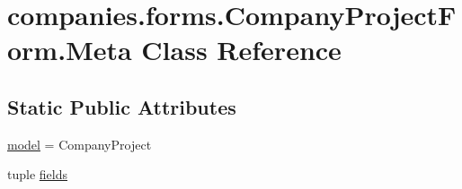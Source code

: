 \hypertarget{classcompanies_1_1forms_1_1_company_project_form_1_1_meta}{\section{companies.\-forms.\-Company\-Project\-Form.\-Meta Class Reference}
\label{classcompanies_1_1forms_1_1_company_project_form_1_1_meta}
}
\subsection*{Static Public Attributes}
\begin{DoxyCompactItemize}
\item 
\hyperlink{classcompanies_1_1forms_1_1_company_project_form_1_1_meta_a44c0687986a0e965a21226b737bacebb}{model} = Company\-Project
\item 
tuple \hyperlink{classcompanies_1_1forms_1_1_company_project_form_1_1_meta_a203ec8fb5710890f2c8891d90e004ac8}{fields}
\end{DoxyCompactItemize}


